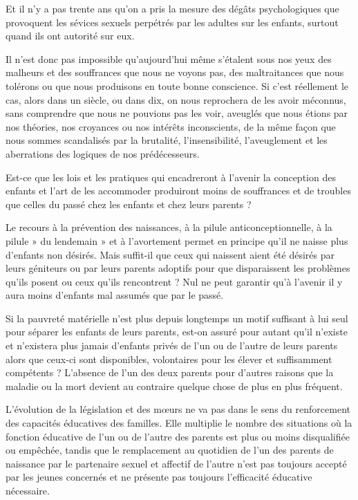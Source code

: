  Et il n'y a pas trente ans qu'on a pris la mesure des dégâts psychologiques que provoquent les sévices sexuels perpétrés par les adultes sur les enfants, surtout quand ils ont autorité sur eux. 

 Il n'est donc pas impossible qu'aujourd'hui même s'étalent sous nos yeux des malheurs et des souffrances que nous ne voyons pas, des maltraitances que nous tolérons ou que nous produisons en toute bonne conscience. Si c'est réellement le cas, alors dans un siècle, ou dans dix, on nous reprochera de les avoir méconnus, sans comprendre que nous ne pouvions pas les voir, aveuglés que nous étions par nos théories, nos croyances ou nos intérêts inconscients, de la même façon que nous sommes scandalisés par la brutalité, l'insensibilité, l'aveuglement et les aberrations des logiques de nos prédécesseurs. 

 Est-ce que les lois et les pratiques qui encadreront à l'avenir la conception des enfants et l'art de les accommoder produiront moins de souffrances et de troubles que celles du passé chez les enfants et chez leurs parents ?

 Le recours à la prévention des naissances, à la pilule anticonceptionnelle, à la pilule » du lendemain » et à l'avortement permet en principe qu'il ne naisse plus d'enfants non désirés. Mais suffit-il que ceux qui naissent aient été désirés par leurs géniteurs ou par leurs parents adoptifs pour que disparaissent les problèmes qu'ils posent ou ceux qu'ils rencontrent ? Nul ne peut garantir qu'à l'avenir il y aura moins d'enfants mal assumés que par le passé. 

 Si la pauvreté matérielle n'est plus depuis longtemps un motif suffisant à lui seul pour séparer les enfants de leurs parents, est-on assuré pour autant qu'il n'existe et n'existera plus jamais d'enfants privés de l'un ou de l'autre de leurs parents alors que ceux-ci sont disponibles, volontaires pour les élever et suffisamment compétents ? L'absence de l'un des deux parents pour d'autres raisons que la maladie ou la mort devient au contraire quelque chose de plus en plus fréquent. 

 L'évolution de la législation et des mœurs ne va pas dans le sens du renforcement des capacités éducatives des familles. Elle multiplie le nombre des situations où la fonction éducative de l'un ou de l'autre des parents est plus ou moins disqualifiée ou empêchée, tandis que le remplacement au quotidien de l'un des parents de naissance par le partenaire sexuel et affectif de l'autre n'est pas toujours accepté par les jeunes concernés et ne présente pas toujours l'efficacité éducative nécessaire. 

